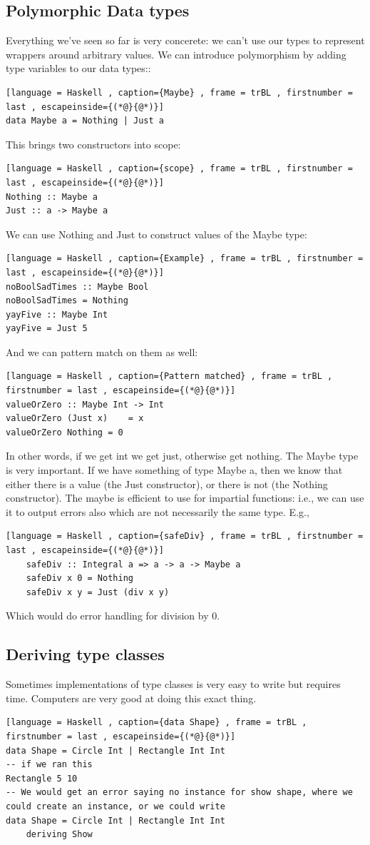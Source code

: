 \documentclass[a4paper]{article}
\theoremstyle{plain}
\theoremstyle{definition}
\theoremstyle{remark}
\begin{document}
\subsection{Polymorphic Data types}
Everything we've seen so far is very concerete: we can't use our types to represent wrappers around arbitrary values. We can introduce polymorphism by adding type variables to our data types::
\begin{lstlisting}[language = Haskell , caption={Maybe} , frame = trBL , firstnumber = last , escapeinside={(*@}{@*)}]
data Maybe a = Nothing | Just a
\end{lstlisting}
This brings two constructors into scope:
\begin{lstlisting}[language = Haskell , caption={scope} , frame = trBL , firstnumber = last , escapeinside={(*@}{@*)}]
Nothing :: Maybe a
Just :: a -> Maybe a
\end{lstlisting}
We can use Nothing and Just to construct values of the Maybe type:
\begin{lstlisting}[language = Haskell , caption={Example} , frame = trBL , firstnumber = last , escapeinside={(*@}{@*)}]
noBoolSadTimes :: Maybe Bool
noBoolSadTimes = Nothing
yayFive :: Maybe Int
yayFive = Just 5
\end{lstlisting}
And we can pattern match on them as well:
\begin{lstlisting}[language = Haskell , caption={Pattern matched} , frame = trBL , firstnumber = last , escapeinside={(*@}{@*)}]
valueOrZero :: Maybe Int -> Int
valueOrZero (Just x) 	= x
valueOrZero Nothing	= 0
\end{lstlisting}
	In other words, if we get int we get just, otherwise get nothing. The Maybe type is very important. If we have something of type Maybe a, then we know that either there is a value (the Just constructor), or there is not (the Nothing constructor). The maybe is efficient to use for impartial functions: i.e., we can use it to output errors also which are not necessarily the same type. E.g.,
	\begin{lstlisting}[language = Haskell , caption={safeDiv} , frame = trBL , firstnumber = last , escapeinside={(*@}{@*)}]
	safeDiv :: Integral a => a -> a -> Maybe a
	safeDiv x 0 = Nothing
	safeDiv x y = Just (div x y)
	\end{lstlisting}
Which would do error handling for division by $0$.
\subsection{Deriving type classes}
Sometimes implementations of type classes is very easy to write but requires time. Computers are very good at doing this exact thing.
\begin{lstlisting}[language = Haskell , caption={data Shape} , frame = trBL , firstnumber = last , escapeinside={(*@}{@*)}]
data Shape = Circle Int | Rectangle Int Int
-- if we ran this
Rectangle 5 10
-- We would get an error saying no instance for show shape, where we could create an instance, or we could write
data Shape = Circle Int | Rectangle Int Int
	deriving Show
\end{lstlisting}
\end{document}
